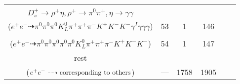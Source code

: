 \documentclass[landscape]{article}
\newcounter{rownumbers}
\newcommand\rn{\stepcounter{rownumbers}\arabic{rownumbers}}
\newcommand{\EOLP}{\\ \hline} %
\newcommand{\topoTags}[1]{#1} %
\begin{document}
\begin{longtable}{clcccc}
\rn & \makecell[l]{ $ 
e^{+} e^{-} \rightarrow K^{-} K^{-} K^{*+} \bar{D}^{*0} D_{s}^{*+} \gamma^{I} ,
K^{*+} \rightarrow \pi^{+} K^{0} ,
\bar{D}^{*0} \rightarrow \pi^{0} \bar{D}^{0} ,
D_{s}^{*+} \rightarrow D_{s}^{+} \gamma ,
K^{0} \rightarrow K_{L}^{0} ,
\bar{D}^{0} \rightarrow \pi^{0} \pi^{-} K^{+} ,
$ \\ $
D_{s}^{+} \rightarrow \rho^{+} \eta ,
\rho^{+} \rightarrow \pi^{0} \pi^{+} ,
\eta \rightarrow \gamma \gamma 
$ \\ ($
e^{+} e^{-} \dashrightarrow \pi^{0} \pi^{0} \pi^{0} K_{L}^{0} \pi^{+} \pi^{+} \pi^{-} K^{+} K^{-} K^{-} \gamma^{I} \gamma \gamma \gamma 
$) } & \topoTags{53 & }1 & 146 \EOLP

\rn & \makecell[l]{ $ 
e^{+} e^{-} \rightarrow \pi^{0} \omega \bar{D}^{*0} D_{2}^{*0} ,
\omega \rightarrow \pi^{0} \pi^{+} \pi^{-} ,
\bar{D}^{*0} \rightarrow \pi^{0} \bar{D}^{0} ,
D_{2}^{*0} \rightarrow \pi^{0} D^{0} ,
\bar{D}^{0} \rightarrow K_{L}^{0} K^{+} K^{-} ,
D^{0} \rightarrow \pi^{0} \pi^{+} K^{-} 
$ \\ ($
e^{+} e^{-} \dashrightarrow \pi^{0} \pi^{0} \pi^{0} \pi^{0} \pi^{0} K_{L}^{0} \pi^{+} \pi^{+} \pi^{-} K^{+} K^{-} K^{-} 
$) } & \topoTags{54 & }1 & 147 \EOLP

rest & \makecell[l]{ $ 
e^{+} e^{-} \rightarrow \rm{others \  (1758 \  in \  total)}
$ \\ ($
e^{+} e^{-} \dashrightarrow \rm{corresponding\ to\ others}
$) } & \topoTags{--- & }1758 & 1905 \\ \hline

\end{longtable}
\end{document}
